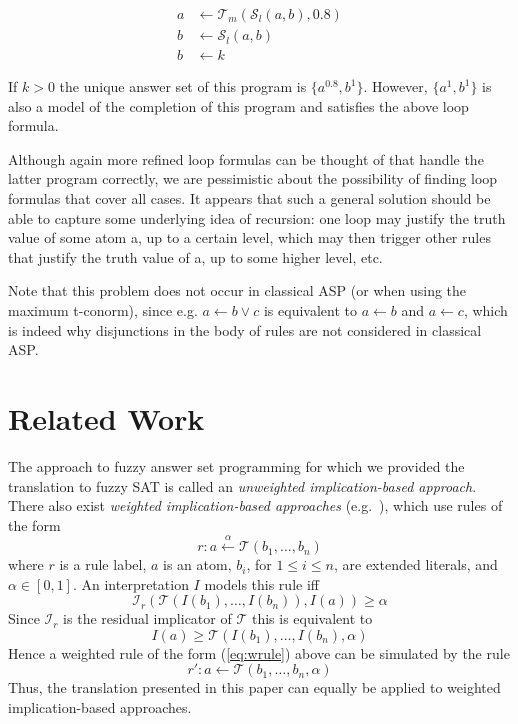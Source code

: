 \documentclass{tlp}
\newcommand{\rulefimp}[1]{\prefimp_{#1}}
\newcommand{\pretnorm}{\mathcal{T}}
\newcommand{\pretconorm}{\mathcal{S}}
\newcommand{\prefimp}{\mathcal{I}}
\begin{document}
\begin{align*}
 a &\gets \pretnorm_m(\pretconorm_l(a,b),0.8)\\
 b &\gets \pretconorm_l(a,b)\\
 b &\gets k
\end{align*}

If $k > 0$ the unique answer set of this program is $\{a^{0.8},b^{1}\}$. However, $\{a^1,b^1\}$ is also a model of the completion
of this program and satisfies the above loop formula.

Although again more refined loop formulas can be thought of that handle the latter program correctly, we are pessimistic about the possibility of finding loop formulas that cover all cases.   It appears that such a general solution should be able to capture some underlying idea of recursion:  one loop may justify the truth value of some atom a, up to a certain level, which may then trigger other rules that justify the truth value of a, up to some higher level, etc.

Note that this problem does not occur in classical ASP (or when using the maximum t-conorm), since e.g. $a \gets b \vee c$ is equivalent to $a \gets b$ and $a \gets c$, which is indeed why disjunctions in the body of rules are not considered in classical ASP. 

\section{Related Work}\label{sec:related}

The approach to fuzzy answer set programming for which we provided the translation to fuzzy SAT is called an \emph{unweighted implication-based approach}. There also exist \emph{weighted implication-based approaches} (e.g.~\cite{LukaStraccia07,madrid:existenceandunicity,MadridOjeda-Aciego-2008a,MadridAciego2009}), which use rules of the form
 \begin{equation}r: a \stackrel{\alpha}{\gets} \pretnorm(b_{1},\ldots,b_{n})\label{eq:wrule}\end{equation}
 where $r$ is a rule label, $a$ is an atom, $b_{i}$, for $1 \leq i \leq n$, are extended literals, and $\alpha \in [0,1]$. An interpretation $I$ models this rule iff
 $$\rulefimp{r}(\pretnorm(I(b_{1}),\ldots,I(b_{n})),I(a)) \geq \alpha$$
 Since $\rulefimp{r}$ is the residual implicator of $\pretnorm$ this is equivalent to 
 $$I(a) \geq \pretnorm(I(b_{1}),\ldots,I(b_{n}),\alpha)$$
 Hence a weighted rule of the form (\ref{eq:wrule}) above can be simulated by the rule
 $$r': a \gets \pretnorm(b_{1},\ldots,b_{n},\alpha)$$
Thus, the translation presented in this paper can equally be applied to weighted implication-based approaches.
\end{document}
